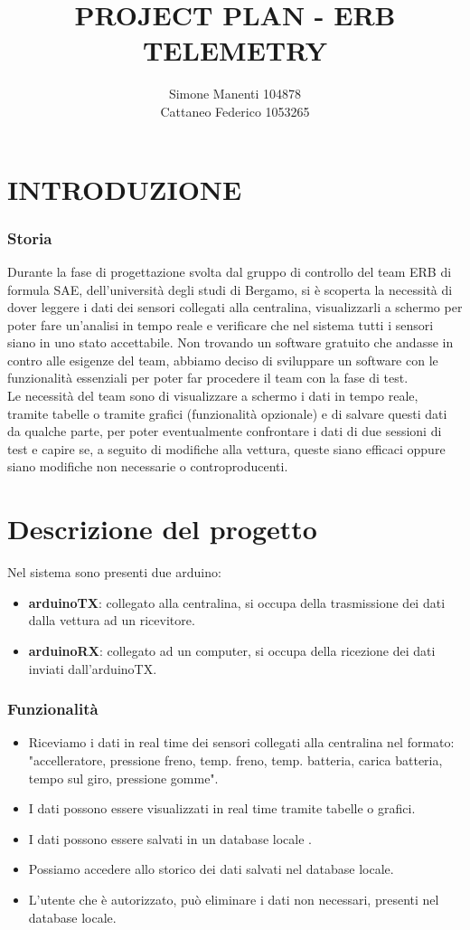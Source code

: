 \documentclass{report}
\title{PROJECT PLAN - ERB TELEMETRY}
\author{Simone Manenti 104878\\ Cattaneo Federico 1053265}
\begin{document}
\maketitle

\chapter{INTRODUZIONE}
\subsection{Storia}
Durante la fase di progettazione svolta dal gruppo di controllo del team ERB di formula SAE, dell'università degli studi di Bergamo, si è scoperta la necessità di dover leggere i dati dei sensori collegati alla centralina, visualizzarli a schermo per poter fare un'analisi in tempo reale e verificare che nel sistema tutti i sensori siano in uno stato accettabile.
Non trovando un software gratuito che andasse in contro alle esigenze del team, abbiamo deciso di sviluppare un software con le funzionalità essenziali per poter far procedere il team con la fase di test.
\\
Le necessità del team sono di visualizzare a schermo i dati in tempo reale, tramite tabelle o tramite grafici (funzionalità opzionale) e di salvare questi dati da qualche parte, per poter eventualmente confrontare i dati di due sessioni di test e capire se, a seguito di modifiche alla vettura, queste siano efficaci oppure siano modifiche non necessarie o controproducenti.


\chapter{Descrizione del progetto}
Nel sistema sono presenti due arduino:
\begin{itemize}
\item \textbf{arduinoTX}: collegato alla centralina, si occupa della trasmissione dei dati dalla vettura ad un ricevitore.
\item \textbf{arduinoRX}: collegato ad un computer, si occupa della ricezione dei dati inviati dall'arduinoTX.
\end{itemize}

\subsection{Funzionalità}

\begin{itemize}
\item Riceviamo i dati in real time dei sensori collegati alla centralina nel formato: "accelleratore, pressione freno, temp. freno, temp. batteria, carica batteria, tempo sul giro, pressione gomme".
\item I dati possono essere visualizzati in real time tramite tabelle o grafici.
\item I dati possono essere salvati in un database locale .
\item Possiamo accedere allo storico dei dati salvati nel database locale.
\item L'utente che è autorizzato, può eliminare i dati non necessari, presenti nel database locale.
\end{itemize}
\end{document}
